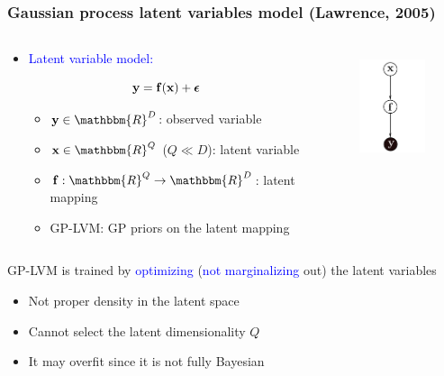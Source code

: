 \documentclass{beamer}
\begin{document}
\frame
{
\frametitle{Gaussian process latent variables model (Lawrence, 2005)}


\begin{columns}
\begin{column}[t]{8cm}

\begin{itemize}
\item \textcolor{blue}{Latent variable model:} 

$$
\mathbf{y}  = \mathbf{f}(\mathbf{x})  + \boldsymbol{\epsilon} 
$$

\begin{itemize}

\item $\bfy \in \mathbbm{R}^D$: observed variable
\item $\bfx \in \mathbbm{R}^Q$ ($Q \ll D$): latent variable 
\item $\bff : \mathbbm{R}^Q \rightarrow \mathbbm{R}^D$: latent mapping 

\item GP-LVM: GP priors on the latent mapping

\end{itemize}
\end{itemize}

\end{column}

\begin{column}[t]{4cm}
\begin{figure}
\includegraphics[width=25mm,height=33mm]{../../../vargplvm/tex/diagrams/Figure1}
\end{figure}

\end{column}
\end{columns}

\vspace{0.3cm}

GP-LVM is trained by \textcolor{blue}{optimizing} 
      (\textcolor{blue}{not marginalizing} out) the latent variables

\begin{itemize}

\item Not proper density in the latent space 

\item Cannot select the latent dimensionality $Q$ 

\item It may overfit since it is not fully Bayesian 

\end{itemize}


}
\end{document}
